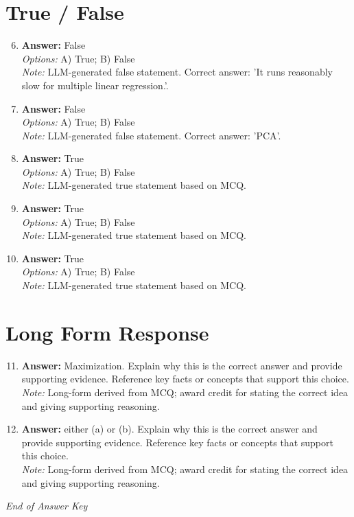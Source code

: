\documentclass[12pt]{article}
\begin{document}
\section*{True / False}
\begin{enumerate}[label=\arabic*.]
\setcounter{enumi}{5}
\item \textbf{Answer:} False
\\ \textit{Options:} A) True; B) False
\\ \textit{Note:} LLM-generated false statement. Correct answer: 'It runs reasonably slow for multiple linear regression.'.
\item \textbf{Answer:} False
\\ \textit{Options:} A) True; B) False
\\ \textit{Note:} LLM-generated false statement. Correct answer: 'PCA'.
\item \textbf{Answer:} True
\\ \textit{Options:} A) True; B) False
\\ \textit{Note:} LLM-generated true statement based on MCQ.
\item \textbf{Answer:} True
\\ \textit{Options:} A) True; B) False
\\ \textit{Note:} LLM-generated true statement based on MCQ.
\item \textbf{Answer:} True
\\ \textit{Options:} A) True; B) False
\\ \textit{Note:} LLM-generated true statement based on MCQ.
\end{enumerate}

\section*{Long Form Response}
\begin{enumerate}[label=\arabic*.]
\setcounter{enumi}{10}
\item \textbf{Answer:} Maximization. Explain why this is the correct answer and provide supporting evidence. Reference key facts or concepts that support this choice.
\\ \textit{Note:} Long-form derived from MCQ; award credit for stating the correct idea and giving supporting reasoning.
\item \textbf{Answer:} either (a) or (b). Explain why this is the correct answer and provide supporting evidence. Reference key facts or concepts that support this choice.
\\ \textit{Note:} Long-form derived from MCQ; award credit for stating the correct idea and giving supporting reasoning.
\end{enumerate}

\vfill
\noindent\textit{End of Answer Key}
\end{document}
